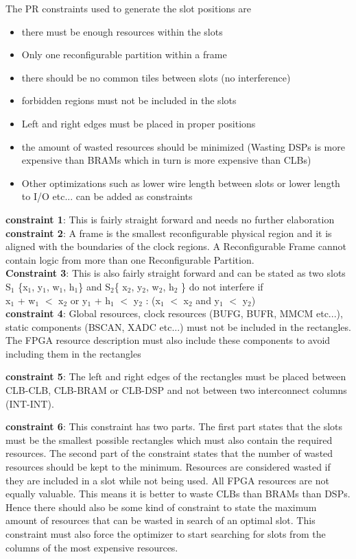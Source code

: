 \documentclass[11pt]{article}
\theoremstyle{definition}
\begin{document}
The PR constraints used to generate the slot positions are
\begin{itemize}
\item there must be enough resources within the slots
\item Only one reconfigurable partition within a frame
\item there should be no common tiles between slots (no interference)
\item forbidden regions must not be included in the slots
\item Left and right edges must be placed in proper positions
\item the amount of wasted resources should be minimized (Wasting DSPs is more expensive than BRAMs which in turn is more expensive than CLBs)
\item Other optimizations such as lower wire length between slots or lower length to I/O etc... can be added as constraints
\end{itemize}

\textbf{constraint 1}: This is fairly straight forward and needs no further elaboration \\
\textbf{constraint 2}: A frame is the smallest reconfigurable physical region and it is aligned with the boundaries of the clock regions. A Reconfigurable Frame cannot contain logic from more than one Reconfigurable Partition.  \\  
\textbf{Constraint 3}: This is also fairly straight forward and can be stated as two slots S$_1$ \{x$_1$, y$_1$, w$_1$, h$_1$\} and S$_2$\{ x$_2$, y$_2$, w$_2$, h$_2$ \} do not interfere if \\

\hspace{15mm}  x$_1$ + w$_1$ $<$ x$_2$ or y$_1$ + h$_1$ $<$ y$_2$ : (x$_1$ $<$ x$_2$ and y$_1$ $<$ y$_2$) \\

\textbf{constraint 4}: Global resources, clock resources (BUFG, BUFR, MMCM etc...), static components (BSCAN, XADC etc...) must not be included in the rectangles. The FPGA resource description must also include these components to avoid including them in the rectangles

\textbf{constraint 5}: The left and right edges of the rectangles must be placed between CLB-CLB, CLB-BRAM or CLB-DSP and not between two interconnect columns (INT-INT).

\textbf{constraint 6}: This constraint has two parts. The first part states that the slots must be the smallest possible rectangles which must also contain the required resources. The second part of the constraint states that the number of wasted resources should be kept to the minimum. Resources are considered wasted if they are included in a slot while not being used. All FPGA resources are not equally valuable. This means it is better to waste CLBs than BRAMs than DSPs. Hence there should also be some kind of constraint to state the maximum amount of resources that can be wasted in search of an optimal slot. This constraint must also force the optimizer to start searching for slots from the columns of the most expensive resources. \\
\end{document}
